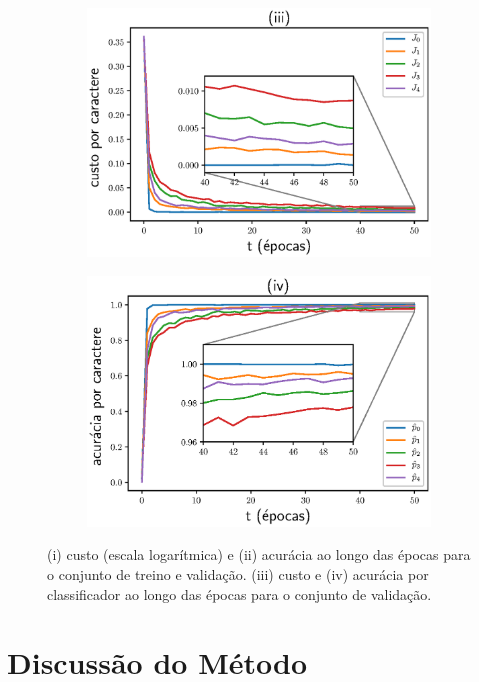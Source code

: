 \begin{figure}[ht]
\begin{center}
\begin{subfigure}{.5\textwidth}
			\centering
			\includegraphics[width=0.95\linewidth]{figuras/C5o6C5o12C5o36C5o36Rfl100MchD_lossi.eps}
		\end{subfigure}\hfill%
		\begin{subfigure}{.5\textwidth}
			\centering
			\includegraphics[width=0.95\linewidth]{figuras/C5o6C5o12C5o36C5o36Rfl100MchD_acci.eps}
		\end{subfigure}\hfill%
		\newline
	\end{center}
	\small (i) custo (escala logarítmica) e (ii) acurácia ao longo das épocas para o conjunto de treino e validação. (iii) custo e (iv) acurácia por classificador ao longo das épocas para o conjunto de validação.  
\end{figure}
 
\section{Discussão do Método}

